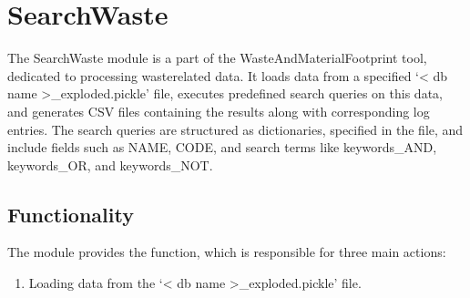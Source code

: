 \documentclass[letterpaper,10pt,english]{sphinxmanual}
\begin{document}
\sphinxstepscope


\section{SearchWaste}
\label{\detokenize{SearchWaste:searchwaste}}\label{\detokenize{SearchWaste::doc}}
\sphinxAtStartPar
The SearchWaste module is a part of the WasteAndMaterialFootprint tool, dedicated to processing waste\sphinxhyphen{}related data.
It loads data from a specified ‘\textless{} db name \textgreater{}\_exploded.pickle’ file, executes predefined search queries on this data,
and generates CSV files containing the results along with corresponding log entries. The search queries are
structured as dictionaries, specified in the  file, and include fields such as NAME,
CODE, and search terms like keywords\_AND, keywords\_OR, and keywords\_NOT.


\subsection{Functionality}
\label{\detokenize{SearchWaste:functionality}}
\sphinxAtStartPar
The module provides the  function, which is responsible for three main actions:
\begin{enumerate}
%
\item {} 
\sphinxAtStartPar
Loading data from the ‘\textless{} db name \textgreater{}\_exploded.pickle’ file.

\end{enumerate}
\end{document}
